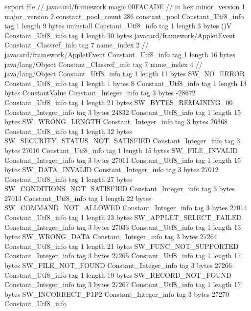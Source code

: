 export file {		// javacard/framework
	magic	00FACADE		 // in hex
	minor_version	1
	major_version	2
	constant_pool_count	286
	constant_pool {
		Constant_Utf8_info {
			tag	1
			length	9
			bytes	uninstall
		}
		Constant_Utf8_info {
			tag	1
			length	3
			bytes	()V
		}
		Constant_Utf8_info {
			tag	1
			length	30
			bytes	javacard/framework/AppletEvent
		}
		Constant_Classref_info {
			tag	7
			name_index	2		// javacard/framework/AppletEvent
		}
		Constant_Utf8_info {
			tag	1
			length	16
			bytes	java/lang/Object
		}
		Constant_Classref_info {
			tag	7
			name_index	4		// java/lang/Object
		}
		Constant_Utf8_info {
			tag	1
			length	11
			bytes	SW_NO_ERROR
		}
		Constant_Utf8_info {
			tag	1
			length	1
			bytes	S
		}
		Constant_Utf8_info {
			tag	1
			length	13
			bytes	ConstantValue
		}
		Constant_Integer_info {
			tag	3
			bytes	-28672
		}
		Constant_Utf8_info {
			tag	1
			length	21
			bytes	SW_BYTES_REMAINING_00
		}
		Constant_Integer_info {
			tag	3
			bytes	24832
		}
		Constant_Utf8_info {
			tag	1
			length	15
			bytes	SW_WRONG_LENGTH
		}
		Constant_Integer_info {
			tag	3
			bytes	26368
		}
		Constant_Utf8_info {
			tag	1
			length	32
			bytes	SW_SECURITY_STATUS_NOT_SATISFIED
		}
		Constant_Integer_info {
			tag	3
			bytes	27010
		}
		Constant_Utf8_info {
			tag	1
			length	15
			bytes	SW_FILE_INVALID
		}
		Constant_Integer_info {
			tag	3
			bytes	27011
		}
		Constant_Utf8_info {
			tag	1
			length	15
			bytes	SW_DATA_INVALID
		}
		Constant_Integer_info {
			tag	3
			bytes	27012
		}
		Constant_Utf8_info {
			tag	1
			length	27
			bytes	SW_CONDITIONS_NOT_SATISFIED
		}
		Constant_Integer_info {
			tag	3
			bytes	27013
		}
		Constant_Utf8_info {
			tag	1
			length	22
			bytes	SW_COMMAND_NOT_ALLOWED
		}
		Constant_Integer_info {
			tag	3
			bytes	27014
		}
		Constant_Utf8_info {
			tag	1
			length	23
			bytes	SW_APPLET_SELECT_FAILED
		}
		Constant_Integer_info {
			tag	3
			bytes	27033
		}
		Constant_Utf8_info {
			tag	1
			length	13
			bytes	SW_WRONG_DATA
		}
		Constant_Integer_info {
			tag	3
			bytes	27264
		}
		Constant_Utf8_info {
			tag	1
			length	21
			bytes	SW_FUNC_NOT_SUPPORTED
		}
		Constant_Integer_info {
			tag	3
			bytes	27265
		}
		Constant_Utf8_info {
			tag	1
			length	17
			bytes	SW_FILE_NOT_FOUND
		}
		Constant_Integer_info {
			tag	3
			bytes	27266
		}
		Constant_Utf8_info {
			tag	1
			length	19
			bytes	SW_RECORD_NOT_FOUND
		}
		Constant_Integer_info {
			tag	3
			bytes	27267
		}
		Constant_Utf8_info {
			tag	1
			length	17
			bytes	SW_INCORRECT_P1P2
		}
		Constant_Integer_info {
			tag	3
			bytes	27270
		}
		Constant_Utf8_info {
}}}
